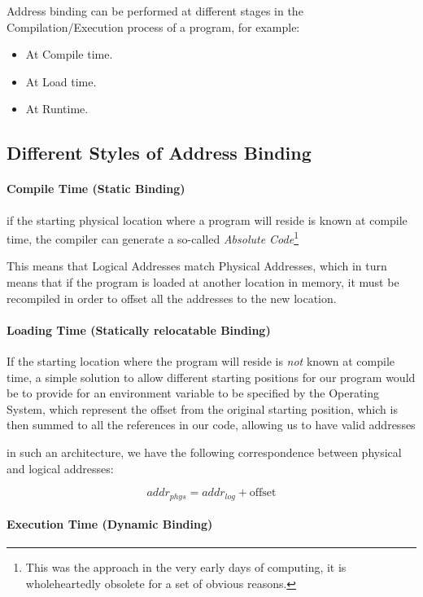 \documentclass[openright, twoside]{report}
\theoremstyle{definition}
\theoremstyle{example}
\begin{document}
		Address binding can be performed at different stages in the Compilation/Execution process of a program, for example:
		\begin{itemize}
			\item At Compile time.
			\item At Load time.
			\item At Runtime.
		\end{itemize}

		\subsection{Different Styles of Address Binding}

		\paragraph{Compile Time (Static Binding)}
		if the starting physical location where a program will reside is known at compile time, the compiler can 
		generate a so-called \emph{Absolute Code}\footnote{This was the approach in the very early days of computing,
		it is wholeheartedly obsolete for a set of obvious reasons.}

		This means that Logical Addresses match Physical Addresses, which in turn means that if the program is loaded 
		at another location in memory, it must be recompiled in order to offset all the addresses to the new location.

		\paragraph{Loading Time (Statically relocatable Binding)}
		
		If the starting location where the program will reside is \emph{not} known at compile time, a simple solution to 
		allow different starting positions for our program would be to provide for an environment variable to be 
		specified by the Operating System, which represent the offset from the original starting position, which is then 
		summed to all the references in our code, allowing us to have valid addresses

		in such an architecture, we have the following correspondence between physical and logical addresses: 

		\[ addr_{phys} = addr_{log} + \text{offset}\]

		\paragraph{Execution Time (Dynamic Binding)}
\end{document}
